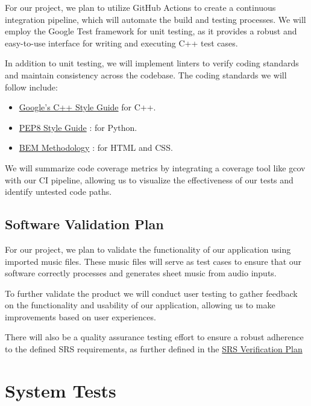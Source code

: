 \documentclass[12pt, titlepage]{article}
\begin{document}
For our project, we plan to utilize GitHub Actions to create a continuous integration pipeline, which will automate the build and 
testing processes. We will employ the Google Test framework for unit testing, as it provides a robust and easy-to-use interface 
for writing and executing C++ test cases.

In addition to unit testing, we will implement linters to verify coding standards and maintain consistency across the codebase. 
The coding standards we will follow include:

\begin{itemize}
    \item \href{https://google.github.io/styleguide/cppguide.html}{Google's C++ Style Guide} \citep*{GoogleCppStyleGuide} for C++.
    \item \href{https://peps.python.org/pep-0008/}{PEP8 Style Guide} \citep*{PEP8PythonStyleGuide}: for Python.
    \item \href{https://getbem.com/}{BEM Methodology} \citep*{BEMMethodology}: for HTML and CSS.
\end{itemize}

We will summarize code coverage metrics by integrating a coverage tool like gcov with our CI pipeline, allowing us to visualize 
the effectiveness of our tests and identify untested code paths.

\subsection{Software Validation Plan}

For our project, we plan to validate the functionality of our application using imported music files. These music files will serve 
as test cases to ensure that our software correctly processes and generates sheet music from audio inputs.

To further validate the product we will conduct user testing to gather feedback on the functionality and usability of our application, 
allowing us to make improvements based on user experiences.

There will also be a quality assurance testing effort to ensure a robust adherence to the defined SRS requirements, as further defined 
in the \hyperref[sec:srs_verification]{SRS Verification Plan}

\section{System Tests}
\end{document}
